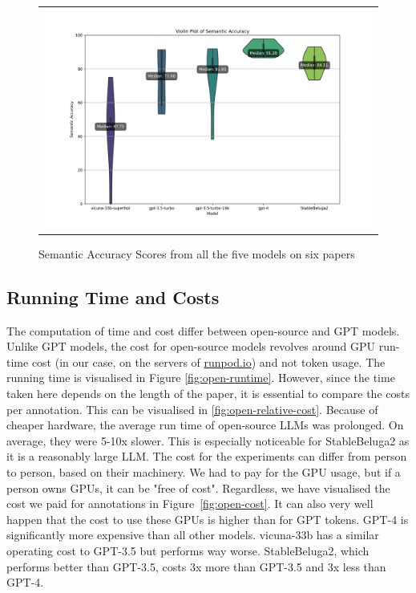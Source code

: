 \begin{figure}[htpb]
  \centering
  \begin{tabular}{c}
  \includegraphics[width=14cm]{images/open-semantic.png}
  \end{tabular}
  \caption[Semantic Accuracy]{Semantic Accuracy Scores from all the five models on six papers}\label{fig:open-semantic}
\end{figure}

\subsection{Running Time and Costs}

The computation of time and cost differ between open-source and GPT models. Unlike GPT models, the cost for open-source models revolves around GPU run-time cost (in our case, on the servers of \href{https://runpod.io}{runpod.io}) and not token usage. The running time is visualised in Figure \ref{fig:open-runtime}. However, since the time taken here depends on the length of the paper, it is essential to compare the costs per annotation. This can be visualised in \ref{fig:open-relative-cost}. Because of cheaper hardware, the average run time of open-source LLMs was prolonged. On average, they were 5-10x slower. This is especially noticeable for StableBeluga2 as it is a reasonably large LLM. The cost for the experiments can differ from person to person, based on their machinery. We had to pay for the GPU usage, but if a person owns GPUs, it can be "free of cost". Regardless, we have visualised the cost we paid for annotations in Figure~\ref{fig:open-cost}. It can also very well happen that the cost to use these GPUs is higher than for GPT tokens. GPT-4 is significantly more expensive than all other models. vicuna-33b has a similar operating cost to GPT-3.5 but performs way worse. StableBeluga2, which performs better than GPT-3.5, costs 3x more than GPT-3.5 and 3x less than GPT-4.

